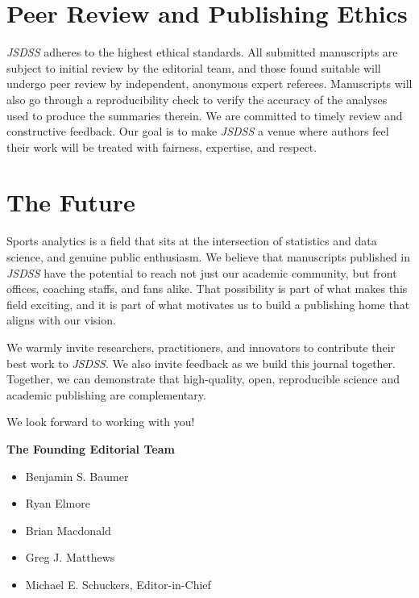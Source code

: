 \documentclass[
  12pt]{article}
\providecommand{\tightlist}{%
  \setlength{\itemsep}{0pt}\setlength{\parskip}{0pt}}
\begin{document}
\section{Peer Review and Publishing
Ethics}\label{peer-review-and-publishing-ethics}

\emph{JSDSS} adheres to the highest ethical standards. All submitted
manuscripts are subject to initial review by the editorial team, and
those found suitable will undergo peer review by independent, anonymous
expert referees. Manuscripts will also go through a reproducibility
check to verify the accuracy of the analyses used to produce the
summaries therein. We are committed to timely review and constructive
feedback. Our goal is to make \emph{JSDSS} a venue where authors feel
their work will be treated with fairness, expertise, and respect.

\section{The Future}\label{the-future}

Sports analytics is a field that sits at the intersection of statistics
and data science, and genuine public enthusiasm. We believe that
manuscripts published in \emph{JSDSS} have the potential to reach not
just our academic community, but front offices, coaching staffs, and
fans alike. That possibility is part of what makes this field exciting,
and it is part of what motivates us to build a publishing home that
aligns with our vision.

We warmly invite researchers, practitioners, and innovators to
contribute their best work to \emph{JSDSS}. We also invite feedback as
we build this journal together. Together, we can demonstrate that
high-quality, open, reproducible science and academic publishing are
complementary.

We look forward to working with you!

\textbf{The Founding Editorial Team}

\begin{itemize}
\tightlist
\item
  Benjamin S. Baumer
\item
  Ryan Elmore
\item
  Brian Macdonald
\item
  Greg J. Matthews
\item
  Michael E. Schuckers, Editor-in-Chief
\end{itemize}



\end{document}

